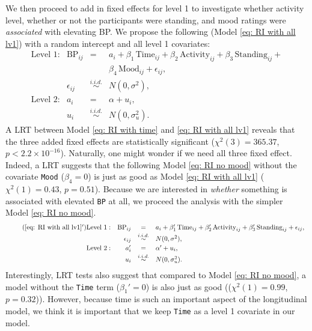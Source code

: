 \documentclass[12pt,twoside,letterpaper]{article}
\theoremstyle{definition}
\theoremstyle{definition}
\begin{document}
We then proceed to add in fixed effects for level 1 to investigate whether activity level, whether or not the participants were standing, and mood ratings were \emph{associated} with elevating BP. We propose the following (Model \ref{eq: RI with all lv1}) with a random intercept and all level 1 covariates:
\begin{equation}\label{eq: RI with all lv1}
    \begin{array}{rrcll}
        \text{Level 1}: & \text{BP}_{ij} &=& a_i + \beta_1\, \text{Time}_{ij} + \beta_2\, \text{Activity}_{ij} + \beta_3\, \text{Standing}_{ij} + \\
        &&& \beta_4\, \text{Mood}_{ij} + \epsilon_{ij}, \\[0.5ex]
         & \epsilon_{ij} &\overset{i.i.d.}{\sim}& N(0, \sigma^2), \\[0.5ex]
        \text{Level 2}: & a_i &=& \alpha + u_i, \\[0.5ex]
         & u_{i} &\overset{i.i.d.}{\sim}& N(0, \sigma_u^2).
    \end{array}
\end{equation}
A LRT between Model \ref{eq: RI with time} and \ref{eq: RI with all lv1} reveals that the three added fixed effects are statistically significant ($\chi^2 (3) = 365.37$, $p < 2.2 \times 10^{-16}$). Naturally, one might wonder if we need all three fixed effect. Indeed, a LRT suggests that the following Model \ref{eq: RI no mood} without the covariate \texttt{Mood} ($\beta_4 = 0$) is just as good as Model \ref{eq: RI with all lv1} ($\chi^2 (1) = 0.43$, $p =0.51$). Because we are interested in \emph{whether} something is associated with elevated \texttt{BP} at all, we proceed the analysis with the simpler Model \ref{eq: RI no mood}.
\begin{equation}\label{eq: RI no mood}
    \begin{array}{rrcll}\tag{\ref{eq: RI with all lv1}$'$}
        \text{Level 1}: & \text{BP}_{ij} &=& a_i + \beta_1'\, \text{Time}_{ij} + \beta_2'\, \text{Activity}_{ij} + \beta_3'\, \text{Standing}_{ij} + \epsilon_{ij}, \\[0.5ex]
         & \epsilon_{ij} &\overset{i.i.d.}{\sim}& N(0, \sigma^2), \\[0.5ex]
        \text{Level 2}: & a_i' &=& \alpha' + u_i, \\[0.5ex]
         & u_{i} &\overset{i.i.d.}{\sim}& N(0, \sigma_u^2).
    \end{array}
\end{equation}
Interestingly, LRT tests also suggest that compared to Model \ref{eq: RI no mood}, a model without the \texttt{Time} term ($\beta_1' = 0$) is also just as good (($\chi^2 (1) = 0.99$, $p = 0.32$)). However, because time is such an important aspect of the longitudinal model, we think it is important that we keep \texttt{Time} as a level 1 covariate in our model.
\end{document}
